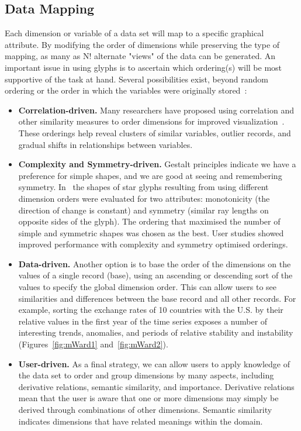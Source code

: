 \subsection{Data Mapping}
\label{sec:dataMapping}
Each dimension or variable of a data set will map to a specific graphical attribute. By modifying the order of dimensions while preserving the type of mapping, as many as N! alternate "views" of the data can be generated.  An important issue in using glyphs is to ascertain which ordering(s) will be most supportive of the task at hand.  Several possibilities exist, beyond random ordering or the order in which the variables were originally stored~\cite{ward08glyphs}:
\begin{itemize}
\item \textbf{Correlation-driven.} Many researchers have proposed using correlation and other similarity measures to order dimensions for improved visualization~\cite{bertin83semiologyOfGraphics,Ankerst:1998,Friendly:2003,Borg:1992}.  These orderings help reveal clusters of similar variables, outlier records, and gradual shifts in relationships between variables.
\item \textbf{Complexity and Symmetry-driven.} Gestalt principles indicate we have a preference for simple shapes, and we are good at seeing and remembering symmetry.  In~\cite{Peng04dimensionReordering} the shapes of star glyphs resulting from using different dimension orders were evaluated for two attributes: monotonicity (the direction of change is constant) and symmetry (similar ray lengths on opposite sides of the glyph).  The ordering that maximised the number of simple and symmetric shapes was chosen as the best.  User studies showed improved performance with complexity and symmetry optimised orderings.
\item \textbf{Data-driven.} Another option is to base the order of the dimensions on the values of a single record (base), using an ascending or descending sort of the values to specify the global dimension order.  This can allow users to see similarities and differences between the base record and all other records.  For example, sorting the exchange rates of 10 countries with the U.S. by their relative values in the first year of the time series exposes a number of interesting trends, anomalies, and periods of relative stability and instability (Figures~\ref{fig:mWard1}  and~\ref{fig:mWard2}).  
\item \textbf{User-driven.} As a final strategy, we can allow users to apply knowledge of the data set to order and group dimensions by many aspects, including derivative relations, semantic similarity, and importance.  Derivative relations mean that the user is aware that one or more dimensions may simply be derived through combinations of other dimensions. Semantic similarity indicates dimensions that have related meanings within the domain.  
\end{itemize}
